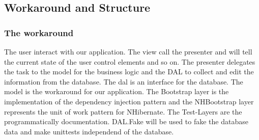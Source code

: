 \documentclass{article}
\begin{document}
\subsection{Workaround and Structure}
\subsubsection{The workaround}
The user interact with our application.
The view call the presenter and will tell the current state of the user control
elements and so on. The presenter delegates the task to the model for the
business logic and the DAL to collect and edit the information from the
database. 
The dal is an interface for the database. The model is the workaround for our application.
The Bootstrap layer is the implementation of the dependency injection pattern
and the NHBootstrap layer represents the unit of work pattern for NHibernate.
The Test-Layers are the programmatically documentation.
DAL.Fake will be used to fake the database data and make unittests independend
of the database.
\end{document}
